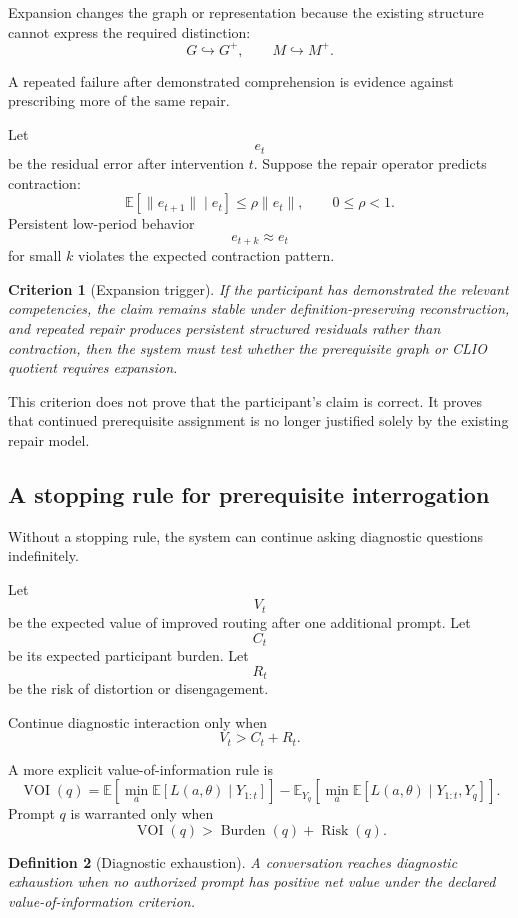 \documentclass[11pt]{article}
\newtheorem{definition}{Definition}[section]
\newtheorem{criterion}[definition]{Criterion}
\theoremstyle{definition}
\DeclareMathOperator{\Burden}{Burden}
\DeclareMathOperator{\Risk}{Risk}
\newcommand{\E}{\mathbb{E}}
\begin{document}
Expansion changes the graph or representation because the existing structure cannot express the required distinction:
\[
G
\hookrightarrow
G^{+},
\qquad
M
\hookrightarrow
M^{+}.
\]

A repeated failure after demonstrated comprehension is evidence against prescribing more of the same repair.

Let
\[
e_t
\]
be the residual error after intervention \(t\). Suppose the repair operator predicts contraction:
\[
\E[\|e_{t+1}\|\mid e_t]
\leq
\rho\|e_t\|,
\qquad
0\leq\rho<1.
\]
Persistent low-period behavior
\[
e_{t+k}\approx e_t
\]
for small \(k\) violates the expected contraction pattern.

\begin{criterion}[Expansion trigger]
If the participant has demonstrated the relevant competencies, the claim remains stable under definition-preserving reconstruction, and repeated repair produces persistent structured residuals rather than contraction, then the system must test whether the prerequisite graph or CLIO quotient requires expansion.
\end{criterion}

This criterion does not prove that the participant's claim is correct. It proves that continued prerequisite assignment is no longer justified solely by the existing repair model.

\subsection{A stopping rule for prerequisite interrogation}

Without a stopping rule, the system can continue asking diagnostic questions indefinitely.

Let
\[
V_t
\]
be the expected value of improved routing after one additional prompt. Let
\[
C_t
\]
be its expected participant burden. Let
\[
R_t
\]
be the risk of distortion or disengagement.

Continue diagnostic interaction only when
\[
V_t>C_t+R_t.
\]

A more explicit value-of-information rule is
\[
\operatorname{VOI}(q)
=
\E
\left[
\min_a
\E[L(a,\theta)\mid Y_{1:t}]
\right]
-
\E_{Y_q}
\left[
\min_a
\E[L(a,\theta)\mid Y_{1:t},Y_q]
\right].
\]
Prompt \(q\) is warranted only when
\[
\operatorname{VOI}(q)
>
\Burden(q)+\Risk(q).
\]

\begin{definition}[Diagnostic exhaustion]
A conversation reaches diagnostic exhaustion when no authorized prompt has positive net value under the declared value-of-information criterion.
\end{definition}
\end{document}
